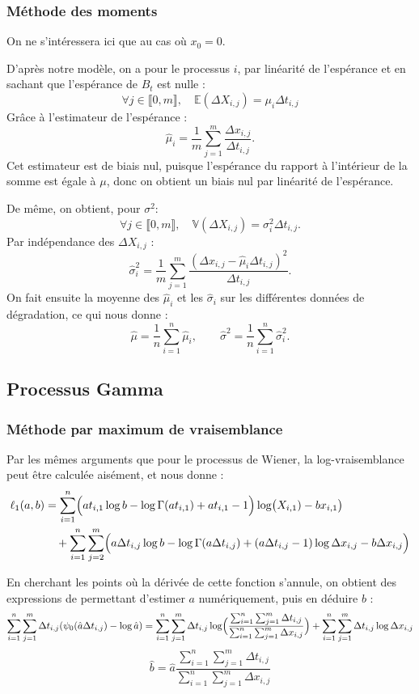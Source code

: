 \documentclass[11pt,a4paper]{article}
\begin{document}
\subsubsection{Méthode des moments} \label{estimateurs:wiener:moments}
On ne s'intéressera ici que au cas où $x_0 = 0$.

D'après notre modèle, on a pour le processus $i$, par linéarité de l'espérance et en sachant que l'espérance de $B_t $ est nulle :$$
\forall j \in \llbracket 0, m \rrbracket, \quad \mathbb{E}(\Delta X_{i,j}) = \mu_i \Delta t_{i,j}
$$
Grâce à l'estimateur de l'espérance : $$
\hat{\mu}_i = \frac{1}{m}\sum_{j=1}^{m}\frac{\Delta x_{i,j}}{\Delta t_{i,j}}.
$$
Cet estimateur est de biais nul, puisque l'espérance du rapport à l'intérieur de la somme est égale à $\mu$, donc on obtient un biais nul par linéarité de l'espérance.

De même, on obtient, pour $\sigma^2$: $$
\forall j \in \llbracket 0, m \rrbracket, \quad \mathbb{V}(\Delta X_{i,j}) = \sigma_i^2 \Delta t_{i,j}.
$$
Par indépendance des $\Delta X_{i,j}$ :
$$
\hat{\sigma}_i^2 = \frac{1}{m} \sum_{j = 1}^{m} \frac{(\Delta x_{i,j} - \hat{\mu}_i \Delta t_{i,j})^2}{\Delta t_{i,j}}.
$$
On fait ensuite la moyenne des $\hat{\mu}_i$ et les $\hat{\sigma}_i$ sur les différentes données de dégradation, ce qui nous donne : $$
\hat{\mu} = \frac{1}{n}\sum_{i=1}^{n} \hat{\mu}_i, \qquad \hat{\sigma}^2 = \frac{1}{n}\sum_{i=1}^{n} \hat{\sigma}_i^2.
$$


\subsection{Processus Gamma} \label{estimateurs:gamma}
\subsubsection{Méthode par maximum de vraisemblance} \label{estimateurs:gamma:vraisemblance}
Par les mêmes arguments que pour le processus de Wiener, la log-vraisemblance peut être calculée aisément, et nous donne : $$
\begin{aligned}
	\ell_1(a,b)
	&= \sum_{i=1}^{n}\Bigl(
	a t_{i,1}\log b - \log \Gamma(a t_{i,1}) + a t_{i,1} - 1
	\Bigr)\log\bigl(X_{i,1})-bx_{i,1}\bigr) \\
	&\quad + \sum_{i=1}^{n}\sum_{j=2}^{m}\Bigl(
	a\Delta t_{i,j}\log b - \log \Gamma(a\Delta t_{i,j})
	+ (a\Delta t_{i,j}-1)\log \Delta x_{i,j}
	- b\Delta x_{i,j}
	\Bigr)
\end{aligned}
$$

En cherchant les points où la dérivée de cette fonction s'annule, on obtient des expressions de permettant d'estimer $a$ numériquement, puis en déduire $b$ : $$
\sum_{i=1}^{n} \sum_{j=1}^{m} \Delta t_{i,j} (\psi_0(\hat{a}\Delta t_{i,j})-\log \hat{a}) = \sum_{i=1}^{n} \sum_{j=1}^{m} \Delta t_{i,j} \log \Bigl( \frac{\sum_{i=1}^{n} \sum_{j=1}^{m} \Delta t_{i,j}}{\sum_{i=1}^{n}\sum_{j=1}^{m}\Delta x_{i,j}} \Bigr)+\sum_{i=1}^{n}\sum_{j=1}^{m} \Delta t_{i,j} \log \Delta x_{i,j}
$$
$$
\hat b = \hat{a} \frac{\sum_{i=1}^{n} \sum_{j=1}^{m} \Delta t_{i,j}}{\sum_{i=1}^{n} \sum_{j=1}^{m} \Delta x_{i,j}}
$$
\end{document}
